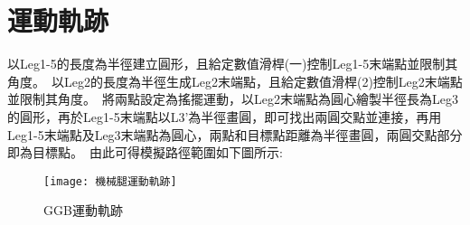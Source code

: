 \section{運動軌跡}
以Leg1-5的長度為半徑建立圓形，且給定數值滑桿(一)控制Leg1-5末端點並限制其角度。\
以Leg2的長度為半徑生成Leg2末端點，且給定數值滑桿(2)控制Leg2末端點並限制其角度。\
將兩點設定為搖擺運動，以Leg2末端點為圓心繪製半徑長為Leg3的圓形，再於Leg1-5末端點以L3’為半徑畫圓，即可找出兩圓交點並連接，再用Leg1-5末端點及Leg3末端點為圓心，兩點和目標點距離為半徑畫圓，兩圓交點部分即為目標點。\
由此可得模擬路徑範圍如下圖所示:\\
\begin{figure}[hbt!]
\begin{center}
\texttt{[image: 機械腿運動軌跡]}
\caption{\Large GGB運動軌跡}\label{機械腿運動軌跡}
\end{center}
\end{figure}
\newpage

